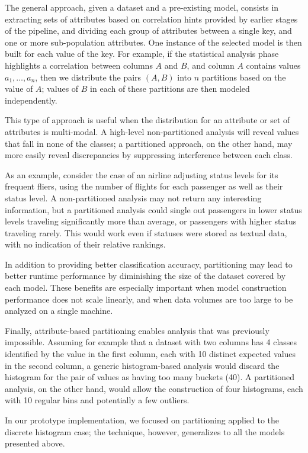 The general approach, given a dataset and a pre-existing model, consists in extracting sets of attributes based on correlation hints provided by earlier stages of the pipeline, and dividing each group of attributes between a single key, and one or more sub-population attributes. One instance of the selected model is then built for each value of the key. For example, if the statistical analysis phase highlights a correlation between columns $A$ and $B$, and column $A$ contains values $a_1, \dots, a_n$, then we distribute the pairs $(A, B)$ into $n$ partitions based on the value of $A$; values of $B$ in each of these partitions are then modeled independently.

This type of approach is useful when the distribution for an attribute or set of attributes is multi-modal. A high-level non-partitioned analysis will reveal values that fall in none of the classes; a partitioned approach, on the other hand, may more easily reveal discrepancies by suppressing interference between each class.

As an example, consider the case of an airline adjusting status levels for its frequent fliers, using the number of flights for each passenger as well as their status level. A non-partitioned analysis may not return any interesting information, but a partitioned analysis could single out passengers in lower status levels traveling significantly more than average, or passengers with higher status traveling rarely. This would work even if statuses were stored as textual data, with no indication of their relative rankings.

In addition to providing better classification accuracy, partitioning may lead to better runtime performance by diminishing the size of the dataset covered by each model. These benefits are especially important when model construction performance does not scale linearly, and when data volumes are too large to be analyzed on a single machine.

Finally, attribute-based partitioning enables analysis that was previously impossible. Assuming for example that a dataset with two columns has 4 classes identified by the value in the first column, each with 10 distinct expected values in the second column, a generic histogram-based analysis would discard the histogram for the pair of values as having too many buckets (40). A partitioned analysis, on the other hand, would allow the construction of four histograms, each with 10 regular bins and potentially a few outliers.

In our prototype implementation, we focused on partitioning applied to the discrete histogram case; the technique, however, generalizes to all the models presented above.

